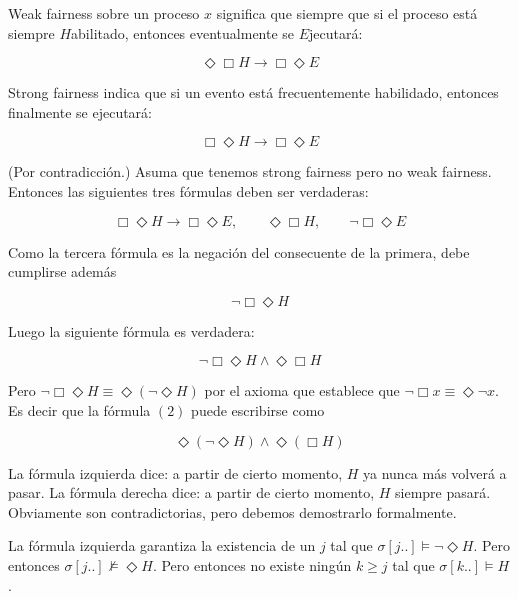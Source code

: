 \documentclass[a4paper, 12pt]{article}
\begin{document}
Weak fairness sobre un proceso $x$ significa que siempre que si el proceso está
siempre $H$abilitado, entonces eventualmente se $E$jecutará:

\begin{equation*}
    \Diamond \Box H \to \Box \Diamond E
\end{equation*}

Strong fairness indica que si un evento está frecuentemente habilidado, entonces
finalmente se ejecutará:

\begin{equation*}
    \Box  \Diamond H \to \Box  \Diamond  E
\end{equation*}

(Por contradicción.) Asuma que tenemos strong fairness pero no weak fairness.
Entonces las siguientes tres fórmulas deben ser verdaderas:

\begin{equation*}
    \Box \Diamond H \to \Box \Diamond E, \qquad \Diamond  \Box  H, \qquad \neg
    \Box \Diamond  E
\end{equation*}

Como la tercera fórmula es la negación del consecuente de la primera, debe
cumplirse además 

\begin{equation*}
    \neg \Box  \Diamond  H
\end{equation*}

Luego la siguiente fórmula es verdadera:

\begin{equation}
    \neg \Box  \Diamond  H \land  \Diamond \Box H
\end{equation}

Pero $\neg \Box \Diamond H \equiv \Diamond (\neg \Diamond H)$ por el axioma que
establece que $\neg \Box x \equiv \Diamond \neg x$. Es decir que la fórmula
$(2)$ puede escribirse como 

\begin{equation}
    \Diamond (\neg \Diamond  H) \land \Diamond (\Box H)
\end{equation}

La fórmula izquierda dice: a partir de cierto momento, $H$ ya nunca más volverá
a pasar. La fórmula derecha dice: a partir de cierto momento, $H$ siempre
pasará. Obviamente son contradictorias, pero debemos demostrarlo formalmente. 

La fórmula izquierda garantiza la existencia de un $j$ tal que $\sigma[j..]
\vDash \neg \Diamond H$. Pero entonces $\sigma[j..] \not\vDash \Diamond H$. Pero
entonces no existe ningún $k \geq j$ tal que $\sigma[k..] \vDash H$.
\end{document}

